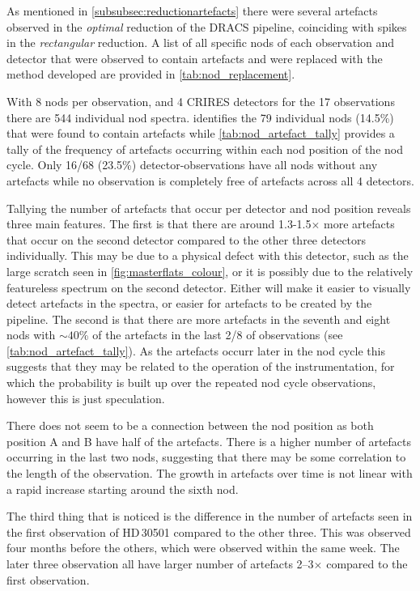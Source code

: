 As mentioned in \cref{subsubsec:reductionartefacts} there were several artefacts observed in the \emph{optimal} reduction of the {DRACS} pipeline, coinciding with spikes in the \emph{rectangular} reduction.
A list of all specific nods of each observation and detector that were observed to contain artefacts and were replaced with the method developed are provided in \cref{tab:nod_replacement}.

With 8 nods per observation, and 4 {CRIRES} detectors for the 17 observations there are 544 individual nod spectra.
 identifies the 79 individual nods (14.5\%) that were found to contain artefacts while \cref{tab:nod_artefact_tally} provides a tally of the frequency of artefacts occurring within each nod position of the nod cycle.
Only 16/68 (23.5\%) detector-observations have all nods without any artefacts while no observation is completely free of artefacts across all 4 detectors.

Tallying the number of artefacts that occur per detector and nod position reveals three main features. The first is that there are around 1.3-1.5$\times$ more artefacts that occur on the second detector compared to the other three detectors individually.
This may be due to a physical defect with this detector, such as the large scratch seen in \cref{fig:masterflats_colour}, or it is possibly due to the relatively featureless spectrum on the second detector.
Either will make it easier to visually detect artefacts in the spectra, or easier for artefacts to be created by the pipeline.
The second is that there are more artefacts in the seventh and eight nods with $\sim40$\% of the artefacts in the last 2/8 of observations (see \cref{tab:nod_artefact_tally}).
As the artefacts occurr later in the nod cycle this suggests that they may be related to the operation of the instrumentation, for which the probability is built up over the repeated nod cycle observations, however this is just speculation.

There does not seem to be a connection between the nod position as both position A and B have half of the artefacts.
There is a higher number of artefacts occurring in the last two nods, suggesting that there may be some correlation to the length of the observation.
The growth in artefacts over time is not linear with a rapid increase starting around the sixth nod.

The third thing that is noticed is the difference in the number of artefacts seen in the first observation of HD\,30501 compared to the other three.
This was observed four months before the others, which were observed within the same week.
The later three observation all have larger number of artefacts 2--3$\times$ compared to the first observation.

